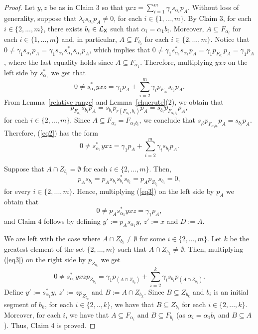 \documentclass[a4paper,12pt]{amsart}
\theoremstyle{definition}
\theoremstyle{remark}
\numberwithin{equation}{section}
\newcommand{\osf}{{\normalfont \textsf{X}}}
\newcommand{\lang}{\CL_{\osf}}
\newcommand{\CL}{\mathcal{L}}
\begin{document}
\begin{proof}
Let $y,z$ be as in Claim 3 so that $yxz=\sum\limits_{i=1}^m\gamma_i s_{\alpha_i}p_A$. Without loss of generality,
suppose that $\lambda_is_{\alpha_i}p_{A}\neq 0$, for each $i\in \{1,...,m\}$. By Claim 3, for each $i\in \{2,...,m\}$, there exists $b_i\in \lang$ such that $\alpha_i=\alpha_1b_i$. Moreover, $A\subseteq F_{\alpha_i}$ for each $i\in \{1,...,m\}$ and, in particular, $A\subseteq F_{b_i}$ for each $i\in \{2,...,m\}$. Notice that $0\neq \gamma_1s_{\alpha_1}p_A=\gamma_1s_{\alpha_1}s_{\alpha_1}^*s_{\alpha_1}p_A$, which implies that $0\neq \gamma_1s_{\alpha_1}^*s_{\alpha_1}p_A=\gamma_1 p_{F_{\alpha_1}}p_A=\gamma_1 p_A$, where the last equality holds since $A\subseteq F_{\alpha_1}$. Therefore, multiplying $yxz$ on the left side by $s_{\alpha_1}^*$ we get that
\begin{equation}\label{eq2} 0 \neq s_{\alpha_1}^*yxz=\gamma_1 p_A + \sum\limits_{i=2}^m \gamma_i p_{F_{\alpha_1}}s_{b_i}p_A.
\end{equation}
From Lemma~\ref{relative range} and Lemma~\ref{chucrute}(2), we obtain that
$$p_{F_{\alpha_1}}s_{b_i}p_A=s_{b_i}p_{r(F_{\alpha_1}, b_i)}p_A=s_{b_i}p_{F_{\alpha_1b_i}}p_A,$$
for each $i\in \{2,...,m\}$.
Since $A\subseteq F_{\alpha_i}= F_{\alpha_1b_i}$, we conclude that $s_{_ib}p_{F_{\alpha_1b_i}}p_A=s_{b_i}p_A.$ Therefore, (\ref{eq2}) has the form 
\begin{equation}\label{eq3}
0\neq s_{\alpha_1}^*yxz=\gamma_1 p_A+\sum\limits_{i=2}^m\gamma_i s_{b_i}p_A.
\end{equation}

Suppose that $A\cap Z_{b_i}=\emptyset$ for each $i\in \{2,...,m\}$. Then, 
$$p_As_{b_i}=p_A s_{b_i}s_{b_i}^*s_{b_i}=p_A p_{Z_{b_i}}s_{b_i}=0,$$ for every $i\in \{2,...,m\}$. Hence, multiplying (\ref{eq3}) on the left side by $p_A$ we obtain that
$$0\neq p_A s_{\alpha_1}^*yxz=\gamma_1 p_A,$$
and Claim 4 follows by defining $y':=p_As_{\alpha_1}y$, $z':=x$ and $D:=A$.

We are left with the case where $A\cap Z_{b_i}\neq \emptyset$ for some $i\in \{2,...,m\}$. Let $k$ be the greatest element of the set $ \{2,...,m\}$ such that $A\cap Z_{b_k}\neq \emptyset$. Then, multiplying (\ref{eq3}) on the right side by $p_{Z_{b_k}}$ we get 
$$0\neq s_{\alpha_1}^*yxzp_{Z_{b_k}}=\gamma_1 p_{(A\cap Z_{b_k})}+\sum\limits_{i=2}^k \gamma_i s_{b_i}p_{(A\cap Z_{b_k})}.$$ Define $y':=s_{\alpha_1}^*y$, $z':=zp_{Z_{b_k}}$ and $B:=A\cap Z_{b_k}$. Since $B\subseteq Z_{b_k}$ and $b_i$ is an initial segment of $b_k$, for each $i\in \{2,..,k\}$, we have that $B\subseteq Z_{b_i}$ for each $i\in \{2,...,k\}$. Moreover, for each $i$, we have that $A\subseteq F_{\alpha_i}$ and $B\subseteq F_{b_i}$ (as 
$\alpha_i=\alpha_1b_i$ and $B\subseteq A$). Thus, Claim 4 is proved.


\end{proof}
\end{document}
